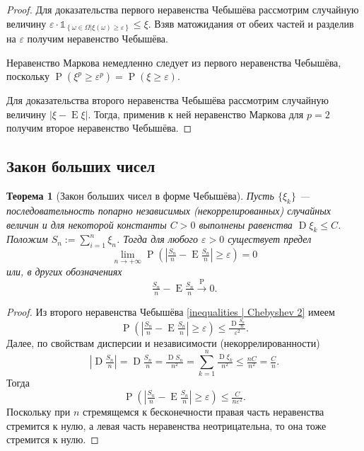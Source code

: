 \documentclass[12pt]{article}
\newtheorem{theorem}{Теорема}
\numberwithin{theorem}{section}
\theoremstyle{definition}
\newcommand{\prob}{\operatorname{P}}
\newcommand{\expect}{\operatorname{E}}
\newcommand{\disp}{\operatorname{D}}
\newcommand{\ind}{\mathds{1}}
\newcommand{\defineset}[2]{\left\{
	\left.
	#1
	\right\vert
	#2
	\right\}}
\begin{document}
	\begin{proof}
		Для доказательства первого неравенства Чебышёва рассмотрим случайную величину 
		$ \varepsilon\cdot\ind_{\defineset{\omega \in \Omega}{\xi(\omega) \geqslant \varepsilon}} \leqslant \xi $.
		Взяв матожидания от обеих частей и разделив на $ \varepsilon $ получим неравенство Чебышёва.
		
		Неравенство Маркова немедленно следует из первого неравенства Чебышёва,
		поскольку $ \prob(\xi^p \geqslant \varepsilon^p) = \prob(\xi \geqslant \varepsilon) $.
		
		Для доказательства второго неравенства Чебышёва рассмотрим случайную величину $ |\xi - \expect\xi| $.
		Тогда, применив к ней неравенство Маркова для $ p = 2 $ получим второе неравенство Чебышёва.
	\end{proof}
	
	\subsection{Закон больших чисел}
	
	\begin{theorem}[Закон больших чисел в форме Чебышёва]
		Пусть $ \{\xi_k\} $ --- последовательность попарно независимых (некоррелированных)
		случайных величин и для некоторой константы $ C > 0 $ выполнены равенства
		$ \disp\xi_k \leqslant C $. Положим $ S_n := \sum\limits_{i = 1}^{n} \xi_n $.
		Тогда для любого $ \varepsilon > 0 $ существует предел
		$$ \lim\limits_{n \to +\infty} \prob(|\tfrac{S_n}{n} - \expect\tfrac{S_n}{n}| \geqslant \varepsilon) = 0 $$ 
		или, в других обозначениях 
		$$ \tfrac{S_n}{n} - \expect\tfrac{S_n}{n} \overset{\prob}{\to} 0. $$
	\end{theorem}
	
	\begin{proof}
		Из второго неравенства Чебышёва \ref{inequalities | Chebyshev 2} имеем
		$$ \prob(|\tfrac{S_n}{n} - \expect\tfrac{S_n}{n}| \geqslant \varepsilon) \leqslant \tfrac{\disp\tfrac{S_n}{n}}{\varepsilon^2}. $$
		Далее, по свойствам дисперсии и независимости (некоррелированности)
		$$ |\disp\tfrac{S_n}{n}| = \disp\tfrac{S_n}{n} = \tfrac{\disp S_n}{n^2} = \sum\limits_{k = 1}^{n} \tfrac{\disp\xi_k}{n^2}
		\leqslant \tfrac{nC}{n^2} = \tfrac{C}{n}. $$
		Тогда
		$$ \prob(|\tfrac{S_n}{n} - \expect\tfrac{S_n}{n}| \geqslant \varepsilon) \leqslant \tfrac{C}{n\varepsilon^2}. $$
		Поскольку при $ n $ стремящемся к бесконечности правая часть неравенства стремится к нулю,
		а левая часть неравенства неотрицательна, то она тоже стремится к нулю.
	\end{proof}
	
\end{document}

